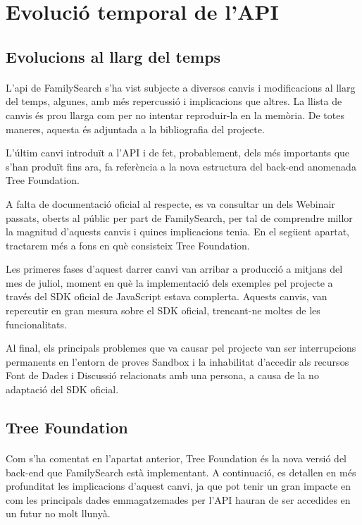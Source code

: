 \section{Evolució temporal de l'API}

    \subsection{Evolucions al llarg del temps}

    \paragraph{}
    L’api de FamilySearch s’ha vist subjecte a diversos canvis i modificacions al llarg del temps, algunes, amb més repercussió i implicacions que altres. La llista de canvis és prou llarga com per no intentar reproduir-la en la memòria. De totes maneres, aquesta és adjuntada a la bibliografia del projecte.

    L’últim canvi introduït a l'API i de fet, probablement, dels més importants que s'han produït fins ara, fa referència a la nova estructura del back-end anomenada Tree Foundation.

    A falta de documentació oficial al respecte, es va consultar un dels Webinair passats, oberts al públic per part de FamilySearch, per tal de comprendre millor la magnitud d'aquests canvis i quines implicacions tenia. En el següent apartat, tractarem més a fons en què consisteix Tree Foundation.

    Les primeres fases d'aquest darrer canvi van arribar a producció a mitjans del mes de juliol, moment en què la implementació dels exemples pel projecte a través del SDK oficial de JavaScript estava complerta. Aquests canvis, van repercutir en gran mesura sobre el SDK oficial, trencant-ne moltes de les funcionalitats.

    Al final, els principals problemes que va causar pel projecte van ser interrupcions permanents en l'entorn de proves Sandbox i la inhabilitat d’accedir als recursos Font de Dades i Discussió relacionats amb una persona, a causa de la no adaptació del SDK oficial.


    \subsection{Tree Foundation}

    \paragraph{}
    Com s'ha comentat en l'apartat anterior, Tree Foundation és la nova versió del back-end que FamilySearch està implementant. A continuació, es detallen en més profunditat les implicacions d'aquest canvi, ja que pot tenir un gran impacte en com les principals dades emmagatzemades per l'API hauran de ser accedides en un futur no molt llunyà.

